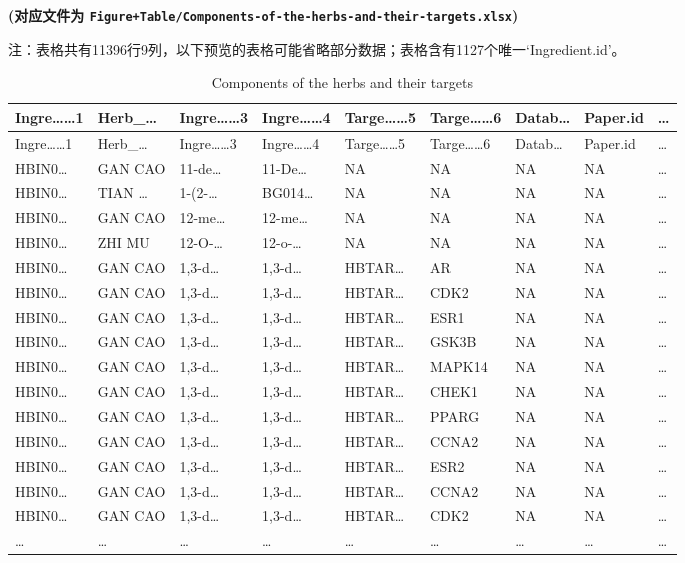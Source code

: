 \documentclass[
]{article}
\begin{document}
\textbf{(对应文件为 \texttt{Figure+Table/Components-of-the-herbs-and-their-targets.xlsx})}

\begin{center}\begin{tcolorbox}[colback=gray!10, colframe=gray!50, width=0.9\linewidth, arc=1mm, boxrule=0.5pt]注：表格共有11396行9列，以下预览的表格可能省略部分数据；表格含有1127个唯一`Ingredient.id'。
\end{tcolorbox}
\end{center}

\begin{longtable}[]{@{}lllllllll@{}}
\caption{\label{tab:Components-of-the-herbs-and-their-targets}Components of the herbs and their targets}\tabularnewline
\toprule
Ingre\ldots\ldots1 & Herb\_\ldots{} & Ingre\ldots\ldots3 & Ingre\ldots\ldots4 & Targe\ldots\ldots5 & Targe\ldots\ldots6 & Datab\ldots{} & Paper.id & \ldots{}\tabularnewline
\midrule
\endfirsthead
\toprule
Ingre\ldots\ldots1 & Herb\_\ldots{} & Ingre\ldots\ldots3 & Ingre\ldots\ldots4 & Targe\ldots\ldots5 & Targe\ldots\ldots6 & Datab\ldots{} & Paper.id & \ldots{}\tabularnewline
\midrule
\endhead
HBIN0\ldots{} & GAN CAO & 11-de\ldots{} & 11-De\ldots{} & NA & NA & NA & NA & \ldots{}\tabularnewline
HBIN0\ldots{} & TIAN \ldots{} & 1-(2-\ldots{} & BG014\ldots{} & NA & NA & NA & NA & \ldots{}\tabularnewline
HBIN0\ldots{} & GAN CAO & 12-me\ldots{} & 12-me\ldots{} & NA & NA & NA & NA & \ldots{}\tabularnewline
HBIN0\ldots{} & ZHI MU & 12-O-\ldots{} & 12-o-\ldots{} & NA & NA & NA & NA & \ldots{}\tabularnewline
HBIN0\ldots{} & GAN CAO & 1,3-d\ldots{} & 1,3-d\ldots{} & HBTAR\ldots{} & AR & NA & NA & \ldots{}\tabularnewline
HBIN0\ldots{} & GAN CAO & 1,3-d\ldots{} & 1,3-d\ldots{} & HBTAR\ldots{} & CDK2 & NA & NA & \ldots{}\tabularnewline
HBIN0\ldots{} & GAN CAO & 1,3-d\ldots{} & 1,3-d\ldots{} & HBTAR\ldots{} & ESR1 & NA & NA & \ldots{}\tabularnewline
HBIN0\ldots{} & GAN CAO & 1,3-d\ldots{} & 1,3-d\ldots{} & HBTAR\ldots{} & GSK3B & NA & NA & \ldots{}\tabularnewline
HBIN0\ldots{} & GAN CAO & 1,3-d\ldots{} & 1,3-d\ldots{} & HBTAR\ldots{} & MAPK14 & NA & NA & \ldots{}\tabularnewline
HBIN0\ldots{} & GAN CAO & 1,3-d\ldots{} & 1,3-d\ldots{} & HBTAR\ldots{} & CHEK1 & NA & NA & \ldots{}\tabularnewline
HBIN0\ldots{} & GAN CAO & 1,3-d\ldots{} & 1,3-d\ldots{} & HBTAR\ldots{} & PPARG & NA & NA & \ldots{}\tabularnewline
HBIN0\ldots{} & GAN CAO & 1,3-d\ldots{} & 1,3-d\ldots{} & HBTAR\ldots{} & CCNA2 & NA & NA & \ldots{}\tabularnewline
HBIN0\ldots{} & GAN CAO & 1,3-d\ldots{} & 1,3-d\ldots{} & HBTAR\ldots{} & ESR2 & NA & NA & \ldots{}\tabularnewline
HBIN0\ldots{} & GAN CAO & 1,3-d\ldots{} & 1,3-d\ldots{} & HBTAR\ldots{} & CCNA2 & NA & NA & \ldots{}\tabularnewline
HBIN0\ldots{} & GAN CAO & 1,3-d\ldots{} & 1,3-d\ldots{} & HBTAR\ldots{} & CDK2 & NA & NA & \ldots{}\tabularnewline
\ldots{} & \ldots{} & \ldots{} & \ldots{} & \ldots{} & \ldots{} & \ldots{} & \ldots{} & \ldots{}\tabularnewline
\bottomrule
\end{longtable}
\end{document}
